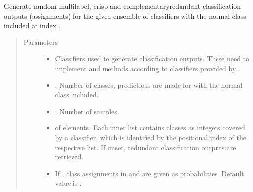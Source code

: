 \documentclass[letterpaper,10pt,english]{sphinxmanual}
\begin{document}
\begin{fulllineitems}
\label{\detokenize{pusion.util.generator:pusion.util.generator.generate_multilabel_cr_ensemble_classification_outputs}}
\sphinxAtStartPar
Generate random multilabel, crisp and complementary\sphinxhyphen{}redundant classification outputs (assignments) for the given
ensemble of classifiers with the normal class included at index .
\begin{quote}\begin{description}
\item[{Parameters}] \leavevmode\begin{itemize}
\item {} 
\sphinxAtStartPar
{} \textendash{} Classifiers used to generate classification outputs.
These need to implement  and  methods according to classifiers provided by .

\item {} 
\sphinxAtStartPar
{} \textendash{} . Number of classes, predictions are made for with the normal class included.

\item {} 
\sphinxAtStartPar
{} \textendash{} . Number of samples.

\item {} 
\sphinxAtStartPar
{} \textendash{}  of  elements. Each inner list contains classes as integers covered by a classifier,
which is identified by the positional index of the respective list.
If unset, redundant classification outputs are retrieved.

\item {} 
\sphinxAtStartPar
{} \textendash{} If , class assignments in  and  are given as
probabilities. Default value is .


\end{itemize}
\end{description}
\end{quote}
\end{fulllineitems}
\end{document}
